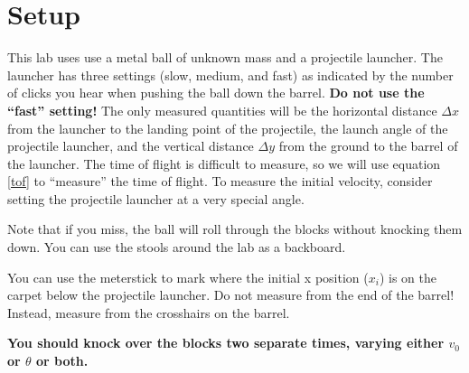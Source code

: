 \documentclass{article}
\begin{document}
\section*{Setup}
This lab uses use a metal ball of unknown mass and a projectile launcher. The launcher has
three settings (slow, medium, and fast) as indicated by the number of clicks you hear when
pushing the ball down the barrel. {\bfseries Do not use the “fast” setting!} The only measured quantities will be the horizontal distance $\Delta x$ from the launcher to the landing point of the projectile, the launch angle of the projectile launcher, and the vertical distance $\Delta y$ from the ground to the barrel of the launcher. The time of flight is difficult to measure, so we will use equation \ref{tof} to ``measure'' the time of flight. To measure the initial velocity, consider setting the projectile launcher at a very special
angle.

Note that if you miss, the ball will roll through the blocks without knocking them down.
You can use the stools around the lab as a backboard.

You can use the meterstick to mark where the initial x position ($x_i$) is on the carpet below
the projectile launcher. Do not measure from the end of the barrel! Instead, measure from
the crosshairs on the barrel.

\textbf{You should knock over the blocks two separate times, varying either $v_0$ or $\theta$ or both.}
\end{document}
